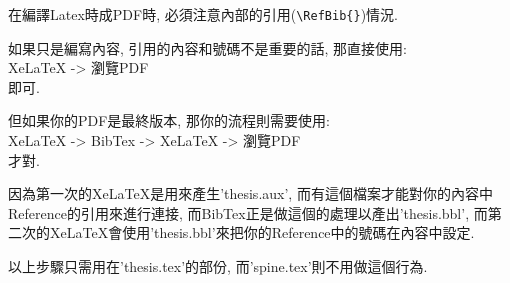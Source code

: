 

\newpage
{}

在編譯Latex時成PDF時, 必須注意內部的引用(\verb|\RefBib{}|)情況.

如果只是編寫內容, 引用的內容和號碼不是重要的話, 那直接使用:\\
XeLaTeX -> 瀏覽PDF\\
即可.

但如果你的PDF是最終版本, 那你的流程則需要使用:\\
XeLaTeX -> BibTex -> XeLaTeX -> 瀏覽PDF\\
才對.

因為第一次的XeLaTeX是用來產生'thesis.aux', 而有這個檔案才能對你的內容中Reference的引用來進行連接, 而BibTex正是做這個的處理以產出'thesis.bbl', 而第二次的XeLaTeX會使用'thesis.bbl'來把你的Reference中的號碼在內容中設定.

以上步驟只需用在'thesis.tex'的部份, 而'spine.tex'則不用做這個行為.


